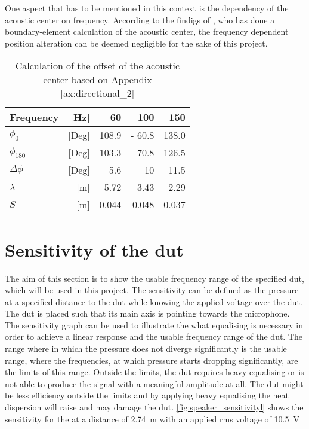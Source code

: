One aspect that has to be mentioned in this context is the dependency of the acoustic center on frequency. According to the findigs of \citep{vanderkooy10}, who has done a boundary-element calculation of the acoustic center, the frequency dependent position alteration can be deemed  negligible for the sake of this project.
\begin{table}[H]
\centering
\caption{Calculation of the offset of the acoustic center based on Appendix \ref{ax:directional_2}}
\label{tab:shift_meas2}
\begin{tabular}{|lr|r|r|r|}
\hline
Frequency              & {[}Hz{]}  & 60    & 100    & 150   \\ \hline
\(\phi_0\)             & {[}Deg{]} & 108.9 & - 60.8 & 138.0 \\ \hline
\(\phi_{180}\)         & {[}Deg{]} & 103.3 & - 70.8 & 126.5 \\ \hline
\(\Delta\phi\)         & {[}Deg{]} & 5.6   & 10     & 11.5  \\ \hline
\(\lambda\)            & {[}m{]}   & 5.72  & 3.43   & 2.29  \\ \hline
\(S\)                  & {[}m{]}   & 0.044 & 0.048  & 0.037 \\ \hline
\end{tabular}
\end{table}

\section{Sensitivity of the \gls{dut}}
The aim of this section is to show the usable frequency range of the specified \gls{dut}, which will be used in this project. The sensitivity can be defined as the pressure at a specified distance to the \gls{dut} while knowing the applied voltage over the \gls{dut}. The \gls{dut} is placed such that its main axis is pointing towards the microphone. The sensitivity graph can be used to illustrate the what equalising is necessary in order to achieve a linear response and the usable frequency range of the \gls{dut}. The range where in which the pressure does not diverge significantly is the usable range, where the frequencies, at which pressure starts dropping significantly, are the limits of this range. Outside the limits, the \gls{dut} requires heavy equalising or is not able to produce the signal with a meaningful amplitude at all. The \gls{dut} might be less efficiency outside the limits and by applying heavy equalising the heat dispersion will raise and may damage the \gls{dut}. \autoref{fig:speaker_sensitivityl} shows the sensitivity for the \citep{seas33} at a distance of \SI{2.74}{\meter} with an applied \gls{rms} voltage of \SI{10.5}{\volt}


